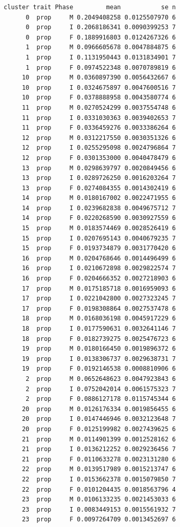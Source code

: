 \documentclass[
  landscape]{article}
\begin{document}
\begin{verbatim}
 cluster trait Phase         mean           se n
       0  prop     M 0.2049408258 0.0125507970 6
       0  prop     I 0.2068186341 0.0090399253 7
       0  prop     F 0.1889916803 0.0124267326 6
       1  prop     M 0.0966605678 0.0047884875 6
       1  prop     I 0.1131950443 0.0131834901 7
       1  prop     F 0.0974522348 0.0070789819 6
      10  prop     M 0.0360897390 0.0056432667 6
      10  prop     I 0.0324675897 0.0047600516 7
      10  prop     F 0.0378888958 0.0043580774 6
      11  prop     M 0.0270524299 0.0037554748 6
      11  prop     I 0.0331030363 0.0039402653 7
      11  prop     F 0.0336459276 0.0033386264 6
      12  prop     M 0.0312217550 0.0030351326 6
      12  prop     I 0.0255295098 0.0024796864 7
      12  prop     F 0.0301353000 0.0040478479 6
      13  prop     M 0.0298639797 0.0020849456 6
      13  prop     I 0.0289726250 0.0016203264 7
      13  prop     F 0.0274084355 0.0014302419 6
      14  prop     M 0.0180167002 0.0022471955 6
      14  prop     I 0.0239682838 0.0049675712 7
      14  prop     F 0.0220268590 0.0030927559 6
      15  prop     M 0.0183574469 0.0028526419 6
      15  prop     I 0.0207695143 0.0040679235 7
      15  prop     F 0.0193734879 0.0031770420 6
      16  prop     M 0.0204768646 0.0014496499 6
      16  prop     I 0.0210672898 0.0029822574 7
      16  prop     F 0.0204666352 0.0027218903 6
      17  prop     M 0.0175185718 0.0016959093 6
      17  prop     I 0.0221042800 0.0027323245 7
      17  prop     F 0.0198308864 0.0027537478 6
      18  prop     M 0.0168036198 0.0045917229 6
      18  prop     I 0.0177590631 0.0032641146 7
      18  prop     F 0.0182739275 0.0025476723 6
      19  prop     M 0.0180166450 0.0019896372 6
      19  prop     I 0.0138306737 0.0029638731 7
      19  prop     F 0.0192146538 0.0008810906 6
       2  prop     M 0.0652648623 0.0047923843 6
       2  prop     I 0.0752042014 0.0061575323 7
       2  prop     F 0.0886127178 0.0115745344 6
      20  prop     M 0.0126176334 0.0019856455 6
      20  prop     I 0.0147446946 0.0032123648 7
      20  prop     F 0.0125199982 0.0027439625 6
      21  prop     M 0.0114901399 0.0012528162 6
      21  prop     I 0.0136212252 0.0029236456 7
      21  prop     F 0.0110633278 0.0023131280 6
      22  prop     M 0.0139517989 0.0015213747 6
      22  prop     I 0.0153662378 0.0015079850 7
      22  prop     F 0.0101204435 0.0018563796 4
      23  prop     M 0.0106133235 0.0021453033 6
      23  prop     I 0.0083449153 0.0015561932 7
      23  prop     F 0.0097264709 0.0013452697 6

\end{verbatim}
\end{document}
